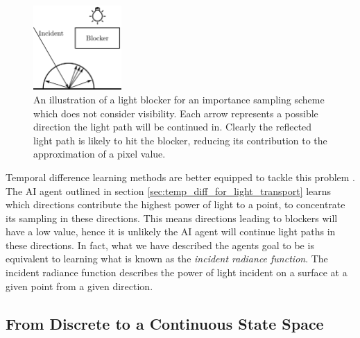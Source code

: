 \documentclass[../dissertation.tex]{subfiles}
\begin{document}
\begin{figure}[h!]
\begin{center}
\includegraphics[width=0.3\textwidth]{images/light_blocker.png}    
\end{center}
\caption{An illustration of a light blocker for an importance sampling scheme which does not consider visibility. Each arrow represents a possible direction the light path will be continued in. Clearly the reflected light path is likely to hit the blocker, reducing its contribution to the approximation of a pixel value.}
\label{fig:blocker}
\end{figure}

Temporal difference learning methods are better equipped to tackle this problem \cite{dahm2017learning}. The AI agent outlined in section \ref{sec:temp_diff_for_light_transport} learns which directions contribute the highest power of light to a point, to concentrate its sampling in these directions. This means directions leading to blockers will have a low value, hence it is unlikely the AI agent will continue light paths in these directions. In fact, what we have described the agents goal to be is equivalent to learning what is known as the \textit{incident radiance function}. The incident radiance function describes the power of light incident on a surface at a given point from a given direction.

\subsection{From Discrete to a Continuous State Space}
\label{sec:discrete_to_continuous_motivation}
\end{document}
